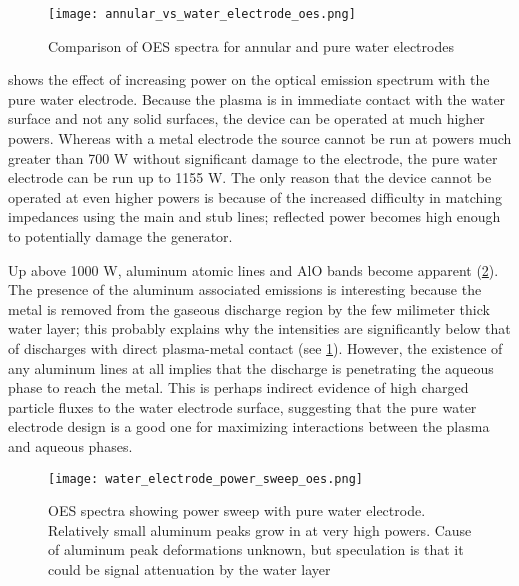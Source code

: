 \begin{figure}[htbp]
  \centering
  \texttt{[image: annular\_vs\_water\_electrode\_oes.png]}
  \caption{Comparison of OES spectra for annular and pure water electrodes}
  \label{fig:annular_vs_water_oes}
\end{figure}

 shows the effect of increasing power on the optical emission spectrum with the pure water electrode. Because the plasma is in immediate contact with the water surface and not any solid surfaces, the device can be operated at much higher powers. Whereas with a metal electrode the source cannot be run at powers much greater than 700 W without significant damage to the electrode, the pure water electrode can be run up to 1155 W. The only reason that the device cannot be operated at even higher powers is because of the increased difficulty in matching impedances using the main and stub lines; reflected power becomes high enough to potentially damage the generator.

Up above 1000 W, aluminum atomic lines and AlO bands become apparent (\cref{fig:pow_sweep_water}). The presence of the aluminum associated emissions is interesting because the metal is removed from the gaseous discharge region by the few milimeter thick water layer; this probably explains why the intensities are significantly below that of discharges with direct plasma-metal contact (see \cref{fig:annular_vs_water_oes}). However, the existence of any aluminum lines at all implies that the discharge is penetrating the aqueous phase to reach the metal. This is perhaps indirect evidence of high charged particle fluxes to the water electrode surface, suggesting that the pure water electrode design is a good one for maximizing interactions between the plasma and aqueous phases.

\begin{figure}[htbp]
  \centering
  \texttt{[image: water\_electrode\_power\_sweep\_oes.png]}
  \caption{OES spectra showing power sweep with pure water electrode. Relatively small aluminum peaks grow in at very high powers. Cause of aluminum peak deformations unknown, but speculation is that it could be signal attenuation by the water layer}
  \label{fig:pow_sweep_water}
\end{figure}



